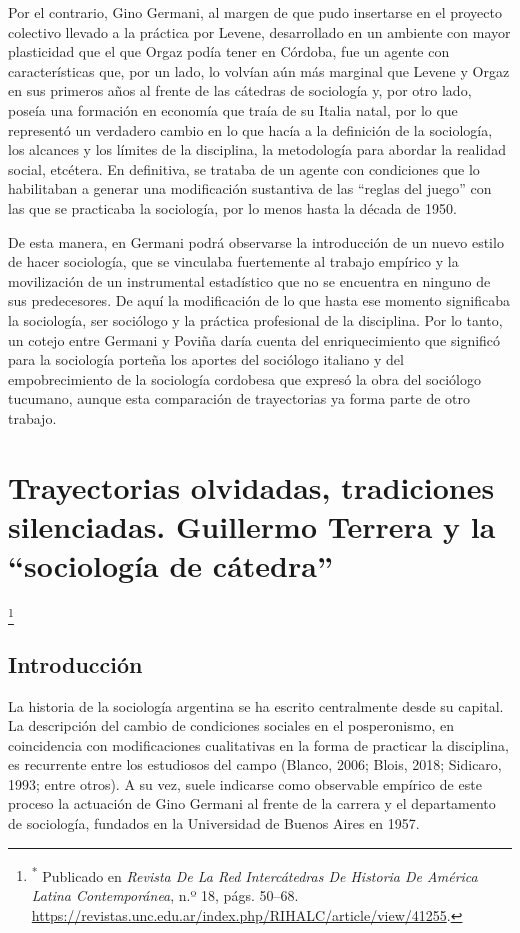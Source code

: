 Por el contrario, Gino Germani, al margen de que pudo insertarse en el proyecto colectivo llevado a la práctica por Levene, desarrollado en un ambiente con mayor plasticidad que el que Orgaz podía tener en Córdoba, fue un agente con características que, por un lado, lo volvían aún más marginal que Levene y Orgaz en sus primeros años al frente de las cátedras de sociología y, por otro lado, poseía una formación en economía que traía de su Italia natal, por lo que representó un verdadero cambio en lo que hacía a la definición de la sociología, los alcances y los límites de la disciplina, la metodología para abordar la realidad social, etcétera. En definitiva, se trataba de un agente con condiciones que lo habilitaban a generar una modificación sustantiva de las \enquote{reglas del juego} con las que se practicaba la sociología, por lo menos hasta la década de 1950.

De esta manera, en Germani podrá observarse la introducción de un nuevo estilo de hacer sociología, que se vinculaba fuertemente al trabajo empírico y la movilización de un instrumental estadístico que no se encuentra en ninguno de sus predecesores. De aquí la modificación de lo que hasta ese momento significaba la sociología, ser sociólogo y la práctica profesional de la disciplina. Por lo tanto, un cotejo entre Germani y Poviña daría cuenta del enriquecimiento que significó para la sociología porteña los aportes del sociólogo italiano y del empobrecimiento de la sociología cordobesa que expresó la obra del sociólogo tucumano, aunque esta comparación de trayectorias ya forma parte de otro trabajo.

\chapter{Trayectorias olvidadas, tradiciones silenciadas. Guillermo Terrera y la \enquote{sociología de cátedra}}

\footnote{\textsuperscript{*} Publicado en \emph{Revista De La Red Intercátedras De Historia De América Latina Contemporánea}, n.º 18, págs. 50--68. \url{https://revistas.unc.edu.ar/index.php/RIHALC/article/view/41255}.}

\section{Introducción}

La historia de la sociología argentina se ha escrito centralmente desde su capital. La descripción del cambio de condiciones sociales en el posperonismo, en coincidencia con modificaciones cualitativas en la forma de practicar la disciplina, es recurrente entre los estudiosos del campo \parencite[entre otros]{1450-VERON1974}(Blanco, 2006; Blois, 2018; Sidicaro, 1993;  entre otros). A su vez, suele indicarse como observable empírico de este proceso la actuación de Gino Germani al frente de la carrera y el departamento de sociología, fundados en la Universidad de Buenos Aires en 1957.

